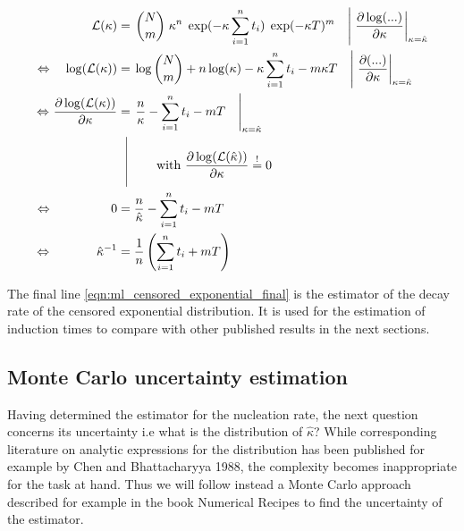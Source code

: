 \begin{align}
\label{eqn:ml_censored_exponential} 
\mathcal{L}(\kappa) & = \left. \binom{N}{m} \;  \kappa^n \; \exp(- \kappa \sum_{i=1}^n t_i) \;  \exp(-\kappa T)^m \quad \right| \left.\frac{\partial \log ( ... )}{\partial \kappa} \right|_{\kappa=\hat{\kappa}} \\
\Leftrightarrow \quad\log ( \mathcal{L}(\kappa)) & = \left.\log\binom{N}{m}  + n \log ( \kappa) - \kappa \sum_{i=1}^n t_i - m \kappa T \quad \right| \left. \frac{\partial(...)}{\partial \kappa} \right|_{\kappa=\hat{\kappa}} \\
\Leftrightarrow \:\! \frac{\partial \log ( \mathcal{L}(\kappa))}{\partial \kappa} & = \left. \frac{n}{ \kappa} - \sum_{i=1}^n t_i - m  T \quad \right|_{\kappa=\hat{\kappa}}\\ 
 & \; \; \, \vrule
  \begin{aligned}[t]
      \raisebox{0.9cm}{ \makebox[0.1cm]{}} \raisebox{-0.5cm}{ \makebox[0.5cm]{}}  \text{with } \frac{\partial \log ( \mathcal{L}(\hat{\kappa})  )}{\partial \kappa}  \stackrel{!}{=} 0  \\
  \end{aligned} \nonumber\\
\Leftrightarrow \qquad\qquad \;\; \:\! 0 &= \frac{n}{ \hat{\kappa}} - \sum_{i=1}^n t_i - m  T \quad\\
\label{eqn:ml_censored_exponential_final}
 \Leftrightarrow \qquad\quad  \;\: \hat{\kappa}^{-1} &= \frac{1}{n} \left(  \sum_{i=1}^n t_i + m T \right)
\end{align}


The final line \autoref{eqn:ml_censored_exponential_final} is the estimator of the decay rate of the censored exponential distribution. It is used for the estimation of induction times to compare with other published results in the next sections.

\subsection{Monte Carlo uncertainty estimation}
\label{sec:mc_uncertainty}
Having determined the estimator for the nucleation rate, the next question concerns its uncertainty i.e what is the distribution of $\hat{\kappa}$? While corresponding literature on analytic expressions for the distribution has been published for example by Chen and Bhattacharyya 1988\cite{Chen1988}, the complexity becomes inappropriate for the task at hand. Thus we will follow instead a Monte Carlo approach described for example in the book Numerical Recipes\cite{Press1992} to find the uncertainty of the estimator.\\

